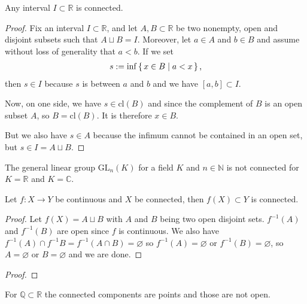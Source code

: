 \begin{thmbox}
    \begin{lemma}
        Any {\color{mathif}interval} \(I \subset \mathbb{R}\) is {\color{maththen}connected}.
    \end{lemma}
\end{thmbox}
%
\begin{proof}
    Fix an interval \(I \subset \mathbb{R}\), and let \(A, B \subset \mathbb{R}\) be two nonempty, open and disjoint subsets such that \(A \sqcup B = I\). Moreover, let \(a \in A\) and \(b \in B\) and assume without loss of generality that \(a < b\). If we set
    \begin{align}
        s := \inf \left\{\, x \in B \mid a < x \,\right\} \text{,}
    \end{align}
    then \(s \in I\) because \(s\) is between \(a\) and \(b\) and we have \([a, b] \subset I\).

    Now, on one side, we have \(s \in \mathrm{cl}(B)\) and since the complement of \(B\) is an open subset \(A\), so \(B = \mathrm{cl}(B)\). It is therefore \(x \in B\).
    
    But we also have \(s \in A\) because the infimum cannot be contained in an open set, but \(s \in I = A \sqcup B\).
\end{proof}

\begin{example}
    The general linear group \(\mathrm{GL}_n(K)\) for a field \(K\) and \(n \in \mathbb{N}\) is not connected for \(K = \mathbb{R}\) and \(K = \mathbb{C}\).
\end{example}

\begin{remark}
    Let \(f: X \longrightarrow Y\) be continuous and \(X\) be connected, then \(f(X) \subset Y\) is connected.
\end{remark}
\begin{proof}
    Let \(f(X) = A \sqcup B\) with \(A\) and \(B\) being two open disjoint sets. \(f^{-1}(A)\) and \(f^{-1}(B)\) are open since \(f\) is continuous. We also have \(f^{-1}(A) \cap f^{-1}B = f^{-1}(A \cap B) = \varnothing\) so \(f^{-1}(A) = \varnothing\) or \(f^{-1}(B) = \varnothing\), so \(A = \varnothing\) or \(B = \varnothing\) and we are done.
\end{proof}
\begin{proof}
\end{proof}
\begin{example}
    For \(\mathbb{Q} \subset \mathbb{R}\) the connected components are points and those are not open.
\end{example}

